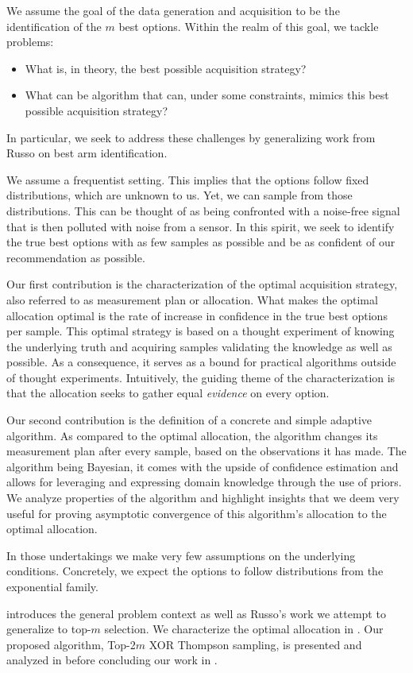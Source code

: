 We assume the goal of the data generation and acquisition to be the identification of the $m$ best options. Within the realm of this goal, we tackle problems:
\begin{itemize}
  \item What is, in theory, the best possible acquisition strategy?
  \item What can be algorithm that can, under some constraints, mimics this best possible acquisition strategy?
\end{itemize}
In particular, we seek to address these challenges by generalizing work from Russo \cite{DBLP:journals/corr/Russo16} on best arm identification.

We assume a frequentist setting. This implies that the options follow fixed distributions, which are unknown to us. Yet, we can sample from those distributions. This can be thought of as being confronted with a noise-free signal that is then polluted with noise from a sensor. In this spirit, we seek to identify the true best options with as few samples as possible and be as confident of our recommendation as possible.

Our first contribution is the characterization of the optimal acquisition strategy, also referred to as measurement plan or allocation. What makes the optimal allocation optimal is the rate of increase in confidence in the true best options per sample. This optimal strategy is based on a thought experiment of knowing the underlying truth and acquiring samples validating the knowledge as well as possible. As a consequence, it serves as a bound for practical algorithms outside of thought experiments. Intuitively, the guiding theme of the characterization is that the allocation seeks to gather equal \emph{evidence} on every option.

Our second contribution is the definition of a concrete and simple adaptive algorithm. As compared to the optimal allocation, the algorithm changes its measurement plan after every sample, based on the observations it has made. The algorithm being Bayesian, it comes with the upside of confidence estimation and allows for leveraging and expressing domain knowledge through the use of priors. We analyze properties of the algorithm and highlight insights that we deem very useful for proving asymptotic convergence of this algorithm's allocation to the optimal allocation.

In those undertakings we make very few assumptions on the underlying conditions. Concretely, we expect the options to follow distributions from the exponential family.

 introduces the general problem context as well as Russo's work we attempt to generalize to top-$m$ selection. We characterize the optimal allocation in . Our proposed algorithm, Top-2$m$ XOR Thompson sampling, is presented and analyzed in  before concluding our work in .
